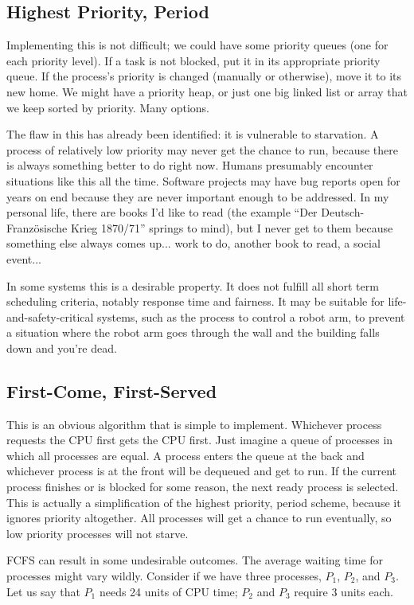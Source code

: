 \subsection*{Highest Priority, Period}

Implementing this is not difficult; we could have some priority queues (one for each priority level). If a task is not blocked, put it in its appropriate priority queue. If the process's priority is changed (manually or otherwise), move it to its new home. We might have a priority heap, or just one big linked list or array that we keep sorted by priority. Many options.

The flaw in this has already been identified: it is vulnerable to starvation. A process of relatively low priority may never get the chance to run, because there is always something better to do right now. Humans presumably encounter situations like this all the time. Software projects may have bug reports open for years on end because they are never important enough to be addressed. In my personal life, there are books I'd like to read (the example ``Der Deutsch-Franz\"osische Krieg 1870/71'' springs to mind), but I never get to them because something else always comes up... work to do, another book to read, a social event...

In some systems this is a desirable property. It does not fulfill all short term scheduling criteria, notably response time and fairness. It may be suitable for life-and-safety-critical systems, such as the process to control a robot arm, to prevent a situation where the robot arm goes through the wall and the building falls down and you're dead.

\subsection*{First-Come, First-Served}
This is an obvious algorithm that is simple to implement. Whichever process requests the CPU first gets the CPU first. Just imagine a queue of processes in which all processes are equal. A process enters the queue at the back and whichever process is at the front will be dequeued and get to run.  If the current process finishes or is blocked for some reason, the next ready process is selected. This is actually a simplification of the highest priority, period scheme, because it ignores priority altogether. All processes will get a chance to run eventually, so low priority processes will not starve.

FCFS can result in some undesirable outcomes. The average waiting time for processes might vary wildly. Consider if we have three processes, $P_{1}$, $P_{2}$, and $P_{3}$. Let us say that $P_{1}$ needs 24 units of CPU time; $P_{2}$ and $P_{3}$ require 3 units each.


